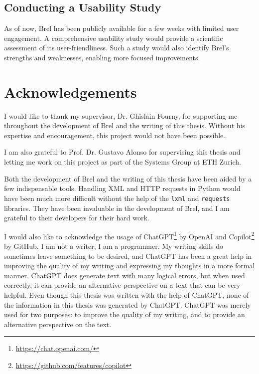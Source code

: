 \subsection{Conducting a Usability Study}

As of now, Brel has been publicly available for a few weeks with limited user engagement.
A comprehensive usability study would provide a scientific assessment of its user-friendliness.
Such a study would also identify Brel's strengths and weaknesses, enabling more focused improvements.

\section{Acknowledgements}

I would like to thank my supervisor, Dr. Ghislain Fourny, 
for supporting me throughout the development of Brel and the writing of this thesis.
Without his expertise and encouragement, this project would not have been possible.

I am also grateful to Prof. Dr. Gustavo Alonso for supervising this thesis and letting me work on this project
as part of the Systems Group at ETH Zurich.

Both the development of Brel and the writing of this thesis have been aided by a few indispensable tools.
Handling XML and HTTP requests in Python would have been much more difficult without the help of the \texttt{lxml} and \texttt{requests} libraries.
They have been invaluable in the development of Brel, and I am grateful to their developers for their hard work.

I would also like to acknowledge the usage of ChatGPT\footnote{\url{https://chat.openai.com/}} by OpenAI 
and Copilot\footnote{\url{https://github.com/features/copilot}} by GitHub.
I am not a writer, I am a programmer.
My writing skills do sometimes leave something to be desired, and ChatGPT has been a great help in improving the quality of my writing and expressing my thoughts in a more formal manner.
ChatGPT does generate text with many logical errors, but when used correctly, it can provide an alternative perspective on a text that can be very helpful. 
Even though this thesis was written with the help of ChatGPT, 
none of the information in this thesis was generated by ChatGPT.
ChatGPT was merely used for two purposes: to improve the quality of my writing, and to provide an alternative perspective on the text.

